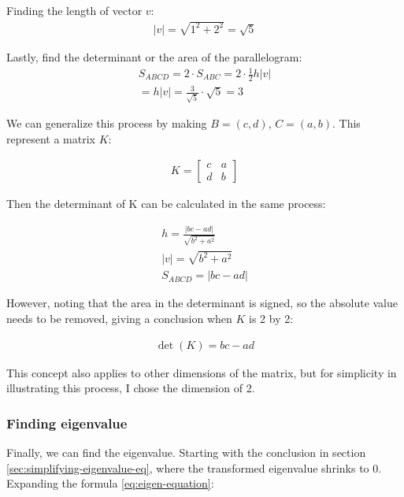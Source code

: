 \documentclass[stu,12pt,floatsintext]{apa7}
\begin{document}
Finding the length of vector $v$:
\begin{gather}
    |v|=\sqrt{1^2+2^2}=\sqrt{5}
\end{gather}

Lastly, find the determinant or the area of the parallelogram:
\begin{gather}
    S_{ABCD}=2\cdot S_{ABC}=2\cdot \frac{1}{2} h |v|\\
    =h|v|=\frac{3}{\sqrt{5}}\cdot \sqrt{5}=3
\end{gather}

We can generalize this process by making $B=(c,d)$, $C=(a,b)$. This represent a matrix $K$:

\begin{gather}
    K=\begin{bmatrix}
        c & a\\
        d & b
    \end{bmatrix}
\end{gather}

Then the determinant of K can be calculated in the same process:

\begin{gather}
    h=\frac{|bc-ad|}{\sqrt{b^2+a^2}}\\
    |v|=\sqrt{b^2+a^2}\\
    S_{ABCD}=|bc-ad|
\end{gather}

However, noting that the area in the determinant is signed, so the absolute value needs to be removed, giving a conclusion when $K$ is 2 by 2:

\begin{gather}
    \det(K)=bc-ad
\end{gather}

This concept also applies to other dimensions of the matrix, but for simplicity in illustrating this process, I chose the dimension of 2. 

\subsubsection{Finding eigenvalue}

Finally, we can find the eigenvalue. Starting with the conclusion in section \ref{sec:simplifying-eigenvalue-eq}, where the transformed eigenvalue shrinks to 0. Expanding the formula \ref{eq:eigen-equation}:
\end{document}
